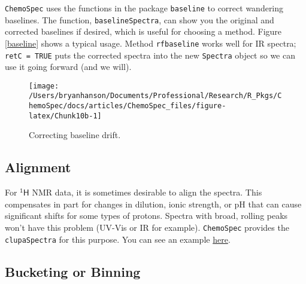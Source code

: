 \documentclass[letter,10pt,twocolumn,twoside,printwatermark=false]{pinp}
\begin{document}
\texttt{ChemoSpec} uses the functions in the package \texttt{baseline}
to correct wandering baselines. The function, \texttt{baselineSpectra},
can show you the original and corrected baselines if desired, which is
useful for choosing a method. Figure \ref{baseline} shows a typical
usage. Method \texttt{rfbaseline} works well for IR spectra;
\texttt{retC = TRUE} puts the corrected spectra into the new
\texttt{Spectra} object so we can use it going forward (and we will).

\begin{Shaded}
\begin{Highlighting}[]
\StringTok{ }
   \NormalTok{,}
   \NormalTok{,}
   \NormalTok{)}
\end{Highlighting}
\end{Shaded}

\begin{figure}

{\centering \texttt{[image: /Users/bryanhanson/Documents/Professional/Research/R\_Pkgs/ChemoSpec/docs/articles/ChemoSpec\_files/figure-latex/Chunk10b-1]} 

}

\caption{\label{baseline}Correcting baseline drift.}\label{fig:Chunk10b}
\end{figure}

\hypertarget{alignment}{%
\subsection{Alignment}\label{alignment}}

For \(\mathsf{^{1}H}\) NMR data, it is sometimes desirable to align the
spectra. This compensates in part for changes in dilution, ionic
strength, or pH that can cause significant shifts for some types of
protons. Spectra with broad, rolling peaks won't have this problem
(UV-Vis or IR for example). \texttt{ChemoSpec} provides the
\texttt{clupaSpectra} for this purpose. You can see an example
\href{http://www.validnmr.com/w/index.php?title=Chemometrics}{here}.

\hypertarget{bucketing-or-binning}{%
\subsection{Bucketing or Binning}\label{bucketing-or-binning}}
\end{document}
